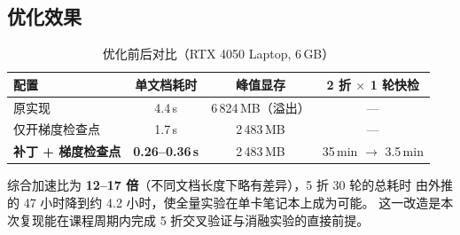 \subsection{优化效果}

\begin{table}[H]
\centering
\caption{优化前后对比（RTX 4050 Laptop, 6\,GB）}
\label{tab:speed}
\small
\begin{tabular}{lccc}
\toprule
配置 & 单文档耗时 & 峰值显存 & 2 折 $\times$ 1 轮快检\\
\midrule
原实现 & 4.4\,s & 6\,824\,MB（溢出） & ---\\
仅开梯度检查点 & 1.7\,s & 2\,483\,MB & ---\\
\textbf{补丁 + 梯度检查点} & \textbf{0.26--0.36\,s} & 2\,483\,MB & 35\,min $\to$ 3.5\,min\\
\bottomrule
\end{tabular}
\end{table}

综合加速比为 \textbf{12--17 倍}（不同文档长度下略有差异），5 折 30 轮的总耗时
由外推的 47 小时降到约 4.2 小时，使全量实验在单卡笔记本上成为可能。
这一改造是本次复现能在课程周期内完成 5 折交叉验证与消融实验的直接前提。

